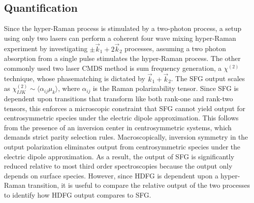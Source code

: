 \documentclass[aip, jcp, reprint, onecolumn]{revtex4-2}
\begin{document}




\subsection{Quantification}

Since the hyper-Raman process is stimulated by a two-photon process, a setup using only two lasers can perform a coherent four wave mixing hyper-Raman experiment by investigating $\pm \vec{k}_1 + 2\vec{k}_2$ processes, assuming a two photon absorption from a single pulse stimulates the hyper-Raman process.
The other commonly used two laser CMDS method is sum frequency generation, a $\chi^{(2)}$ technique, whose phasematching is dictated by $\vec{k}_1 + \vec{k}_2$.
The SFG output scales as $\chi^{(2)}_{IJK} \sim \langle \alpha_{ij} \mu_k \rangle$, where $\alpha_{ij}$ is the Raman polarizability tensor.
Since SFG is dependent upon transitions that transform like both rank-one and rank-two tensors, this enforces a microscopic constraint that SFG cannot yield output for centrosymmetric species under the electric dipole approximation.
This follows from the presence of an inversion center in centrosymmetric systems, which demands strict parity selection rules. \cite{RN230}
Macroscopically, inversion symmetry in the output polarization eliminates output from centrosymmetric species under the electric dipole approximation.\cite{RN227, RN132}
As a result, the output of SFG is significantly reduced relative to most third order spectroscopies because the output only depends on surface species.
However, since HDFG is dependent upon a hyper-Raman transition, it is useful to compare the relative output of the two processes to identify how HDFG output compares to SFG.
\end{document}
